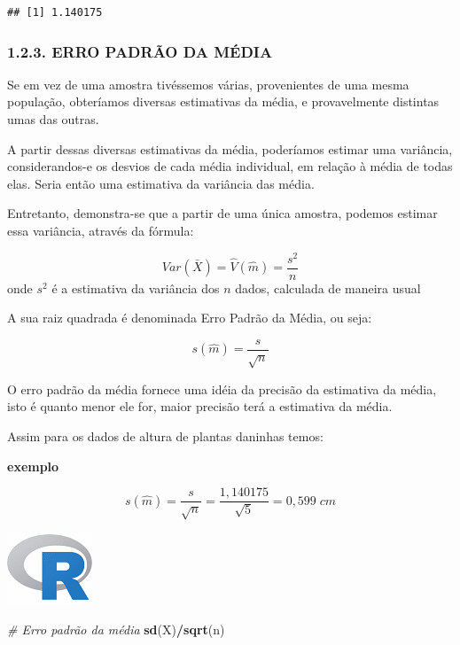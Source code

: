 \documentclass[
]{article}
\newenvironment{Shaded}{\begin{snugshade}}{\end{snugshade}}
\newcommand{\CommentTok}[1]{\textcolor[rgb]{0.56,0.35,0.01}{\textit{#1}}}
\newcommand{\KeywordTok}[1]{\textcolor[rgb]{0.13,0.29,0.53}{\textbf{#1}}}
\newcommand{\NormalTok}[1]{#1}
\newcommand{\OperatorTok}[1]{\textcolor[rgb]{0.81,0.36,0.00}{\textbf{#1}}}
\begin{document}
\begin{verbatim}
## [1] 1.140175
\end{verbatim}

\hypertarget{erro-padruxe3o-da-muxe9dia}{%
\subsubsection{1.2.3. ERRO PADRÃO DA
MÉDIA}\label{erro-padruxe3o-da-muxe9dia}}

Se em vez de uma amostra tivéssemos várias, provenientes de uma mesma
população, obteríamos diversas estimativas da média, e provavelmente
distintas umas das outras.

A partir dessas diversas estimativas da média, poderíamos estimar uma
variância, considerandos-e os desvios de cada média individual, em
relação à média de todas elas. Seria então uma estimativa da variância
das média.

Entretanto, demonstra-se que a partir de uma única amostra, podemos
estimar essa variância, através da fórmula:

\[
Var(\bar{X}) = \hat{V}(\hat{m}) = \frac{s^2}{n}
\] onde \(s^2\) é a estimativa da variância dos \(n\) dados, calculada
de maneira usual

A sua raiz quadrada é denominada Erro Padrão da Média, ou seja:

\[
s(\hat{m}) = \frac{s}{\sqrt{n}}
\]

O erro padrão da média fornece uma idéia da precisão da estimativa da
média, isto é quanto menor ele for, maior precisão terá a estimativa da
média.

Assim para os dados de altura de plantas daninhas temos:

\textbf{exemplo}

\[
s(\hat{m}) = \frac{s}{\sqrt{n}} = \frac{1,140175}{\sqrt{5}} = 0,599\;cm
\]

\includegraphics{R.png}

\begin{Shaded}
\begin{Highlighting}[]
\CommentTok{# Erro padrão da média}
\KeywordTok{sd}\NormalTok{(X)}\OperatorTok{/}\KeywordTok{sqrt}\NormalTok{(n)}
\end{Highlighting}
\end{Shaded}
\end{document}
